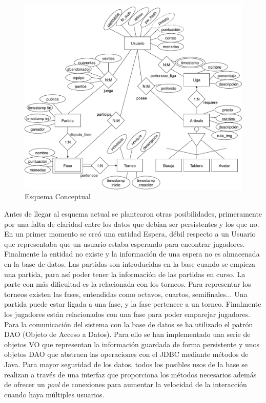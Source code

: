 \begin{figure}[H]
\centering
\includegraphics[scale = 0.5]{figuras/base_datos/diagrama-conceptual.pdf}
\caption{Esquema Conceptual}
\label{fig:diagramaConceptual}
\end{figure}

Antes de llegar al esquema actual se plantearon otras posibilidades, primeramente por una falta de claridad entre los datos que debían ser persistentes y los que no. En un primer momento se creó una entidad Espera, débil respecto a un Usuario que representaba que un usuario estaba esperando para encontrar jugadores. Finalmente la entidad no existe y la información de una espera no es almacenada en la base de datos. Las partidas son introducidas en la base cuando se empieza una partida, para así poder tener la información de las partidas en curso. La parte con más dificultad es la relacionada con los torneos. Para representar los torneos existen las fases, entendidas como octavos, cuartos, semifinales... Una partida puede estar ligada a una fase, y la fase pertenece a un torneo. Finalmente los jugadores están relacionados con una fase para poder emparejar jugadores.\\

Para la comunicación del sistema con la base de datos se ha utilizado el patrón DAO (Objeto de Acceso a Datos). Para ello se han implementado una serie de objetos VO que representan la información guardada de forma persistente y unos objetos DAO que abstraen las operaciones con el JDBC mediante métodos de Java. Para mayor seguridad de los datos, todos los posibles usos de la base se realizan a través de una interfaz que proporciona los métodos necesarios además de ofrecer un \textit{pool} de conexiones para aumentar la velocidad de la interacción cuando haya múltiples usuarios.\\

